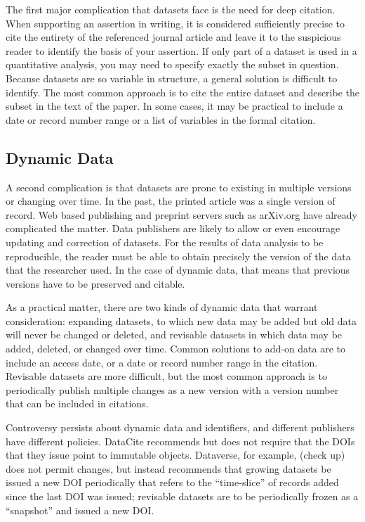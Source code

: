 \documentclass[10pt,a4paper,twocolumn]{article}
\begin{document}
The first major complication that datasets face is the need for deep citation. 
When supporting an assertion in writing, it is considered sufficiently precise to cite the entirety of the referenced journal article and leave it to the suspicious reader to identify the basis of your assertion. 
If only part of a dataset is used in a quantitative analysis, you may need to specify exactly the subset in question. 
Because datasets are so variable in structure, a general solution is difficult to identify. 
The most common approach is to cite the entire dataset and describe the subset in the text of the paper. 
In some cases, it may be practical to include a date or record number range or a list of variables in the formal citation. %

\subsection*{Dynamic Data}\label{dynamic-data}

A second complication is that datasets are prone to existing in multiple versions or changing over time. %
In the past, the printed article was a single version of record.
Web based publishing and preprint servers such as arXiv.org have already complicated the matter. %
Data publishers are likely to allow or even encourage updating and correction of datasets.  %
For the results of data analysis to be reproducible, the reader must be able to obtain precisely the version of the data that the researcher used. 
In the case of dynamic data, that means that previous versions have to be preserved and citable.

As a practical matter, there are two kinds of dynamic data that warrant consideration: expanding datasets, to which new data may be added but old data will never be changed or deleted, and revisable datasets in which data may be added, deleted, or changed over time. 
Common solutions to add-on data are to include an access date, or a date or record number range in the citation. 
Revisable datasets are more difficult, but the most common approach is to periodically publish multiple changes as a new version with a version number that can be included in citations.

Controversy persists about dynamic data and identifiers, and different publishers have different policies. 
DataCite recommends but does not require that the DOIs that they issue point to immutable objects. 
Dataverse, for example, (check up) does not permit changes, but instead recommends that growing datasets be issued a new DOI periodically that refers to the ``time-slice'' of records added since the last DOI was issued; revisable datasets are to be periodically frozen as a ``snapshot'' and issued a new DOI.
\end{document}
